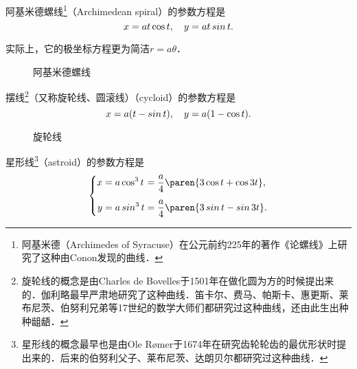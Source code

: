 \begin{definition*}
  阿基米德螺线\footnote{阿基米德（Archimedes of Syracuse）在公元前约225年的著作《论螺线》上研究了这种由Conon发现的曲线．}（Archimedean spiral）的参数方程是
  \[
    \setlength{\abovedisplayskip}{.8ex}
    \setlength{\belowdisplayskip}{.8ex}
    x = at \cos t, \quad y = at \sin t.
  \]

  \begin{remark}
    实际上，它的极坐标方程更为简洁\(r = a \theta\)．
  \end{remark}
\end{definition*}

\begin{figure}[H]
  \centering
  \caption*{阿基米德螺线}
\end{figure}

\begin{definition*}
  摆线\footnote{旋轮线的概念是由Charles de Bovelles于1501年在做化圆为方的时候提出来的．伽利略最早严肃地研究了这种曲线．笛卡尔、费马、帕斯卡、惠更斯、莱布尼茨、伯努利兄弟等17世纪的数学大师们都研究过这种曲线，还由此生出种种龃龉．}（又称旋轮线、圆滚线）（cycloid）的参数方程是
  \[
    \setlength{\abovedisplayskip}{.8ex}
    x = a (t - \sin t), \quad y = a (1 - \cos t).
  \]
\end{definition*}

\begin{figure}[H]
  \centering
  \caption*{旋轮线}
\end{figure}

\begin{definition*}
  星形线\footnote{星形线的概念最早也是由Ole Rømer于1674年在研究齿轮轮齿的最优形状时提出来的．后来的伯努利父子、莱布尼茨、达朗贝尔都研究过这种曲线．}（astroid）的参数方程是
  \[
    \left\{
      \addtolength{\jot}{1ex}
      \begin{alignedat}{2}
        x &= a \cos^3 t &&= \frac a4 \paren{3 \cos t + \cos 3t}, \\
        y &= a \sin^3 t &&= \frac a4 \paren{3 \sin t - \sin 3t}.
      \end{alignedat}
    \right.
  \]
\end{definition*}

